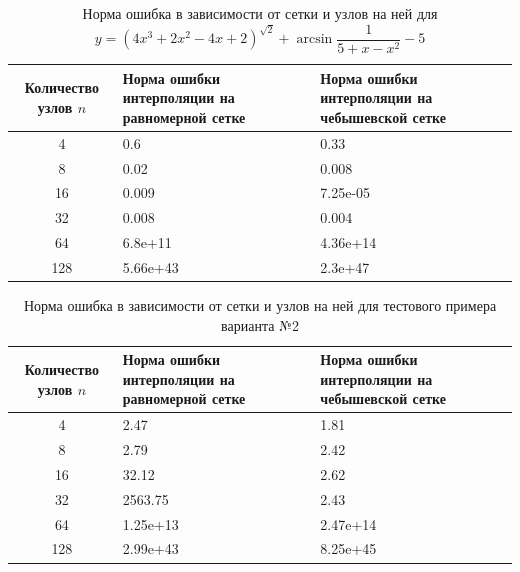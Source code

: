 \documentclass{article}
\begin{document}
    \begin{table}[H]
        \centering
        \caption{Норма ошибка в зависимости от сетки и узлов на ней для $y = (4x^3 + 2x^2 - 4x + 2 )^{\sqrt{2}} + \arcsin{\dfrac{1}{5+x - x^2}} - 5$}
        \begin{tabular}{|c|p{5cm}|p{5cm}|}
            \hline
            Количество узлов $n$ & Норма ошибки интерполяции
            на равномерной сетке & Норма ошибки интерполяции
            на чебышевской сетке \\
            \hline 
            4 &  0.6 &  0.33 \\ \hline
            8 &  0.02 & 0.008\\ \hline
            16 &0.009 & 7.25e-05\\ \hline
            32 & 0.008 & 0.004\\ \hline
            64 & 6.8e+11 & 4.36e+14\\ \hline
            128 & 5.66e+43&  2.3e+47\\ \hline
        \end{tabular}
    \end{table}
    \begin{table}[H]
        \centering
        \caption{Норма ошибка в зависимости от сетки и узлов на ней для тестового примера варианта №2}
        \begin{tabular}{|c|p{5cm}|p{5cm}|}
            \hline
            Количество узлов $n$ & Норма ошибки интерполяции
            на равномерной сетке & Норма ошибки интерполяции
            на чебышевской сетке \\
            \hline 
            4 & 2.47 &  1.81 \\ \hline
            8 & 2.79 & 2.42\\ \hline
            16 &32.12 & 2.62\\ \hline
            32 & 2563.75 & 2.43\\ \hline
            64 &1.25e+13 & 2.47e+14\\ \hline
            128 & 2.99e+43&  8.25e+45\\ \hline
        \end{tabular}
    \end{table}
\end{document}
